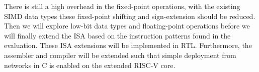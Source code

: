 There is still a high overhead in the fixed-point operations, with the existing SIMD data types these fixed-point shifting and sign-extension should be reduced. Then we will explore low-bit data types and floating-point operations before we will finally extend the ISA based on the instruction patterns found in the evaluation. These ISA extensions will be implemented in RTL. Furthermore, the assembler and compiler will be extended such that simple deployment from networks in C is enabled on the extended RISC-V core.

